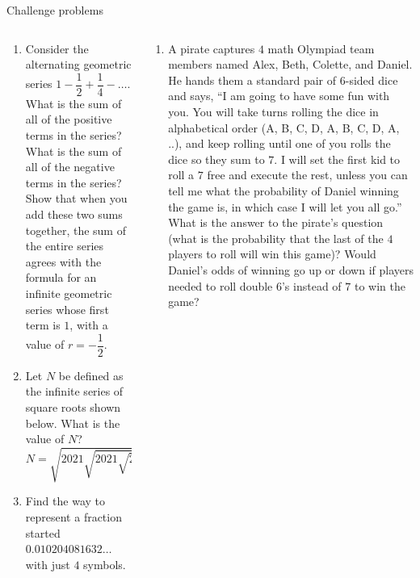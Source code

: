 \documentclass[9pt,aspectratio=169]{beamer}
\begin{document}
\begin{frame}{Challenge problems}
  \begin{columns}[T]
    \begin{column}{0.5\textwidth}
      \begin{enumerate}
        \item Consider the alternating geometric series 
        $1 - \dfrac{1}{2} + \dfrac{1}{4} - \ldots.$   What is the sum of all of the positive terms in the series?  What is the sum of all of the negative terms in the series?  Show that when you add these two sums together, the sum of the entire series agrees with the formula for an infinite geometric series whose first term is $1$, with a value of $r = -\dfrac{1}{2}$.
        \item Let $N$ be defined as the infinite series of square roots shown below.  What is the value of $N$?
        \[ N = \sqrt{2021 \sqrt{2021 \sqrt{2021 \sqrt{\ldots}}}}\]
        \item Find the way to represent a fraction started  $0.010204081632\ldots$ with just $4$ symbols.
        \seti
      \end{enumerate}
    \end{column}
    \begin{column}{0.5\textwidth}
      \begin{enumerate}
        \conti
        \item A pirate captures $4$ math Olympiad team members named Alex, Beth, Colette, and Daniel.  He hands them a standard pair of $6$-sided dice and says, “I am going to have some fun with you.  You will take turns rolling the dice in alphabetical order (A, B, C, D, A, B, C, D, A, ..), and keep rolling until one of you rolls the dice so they sum to $7$. 
        I will set the first kid to roll a $7$ free and execute the rest, unless you can tell me what the probability of Daniel winning the game is, in which case I will let you all go.”  What is the answer to the pirate’s question (what is the probability that the last of the $4$ players to roll will win this game)?  Would Daniel’s odds of winning go up or down if players needed to roll double $6$’s instead of $7$ to win the game?
      \end{enumerate}
    \end{column}
  \end{columns}
\end{frame}
\end{document}
